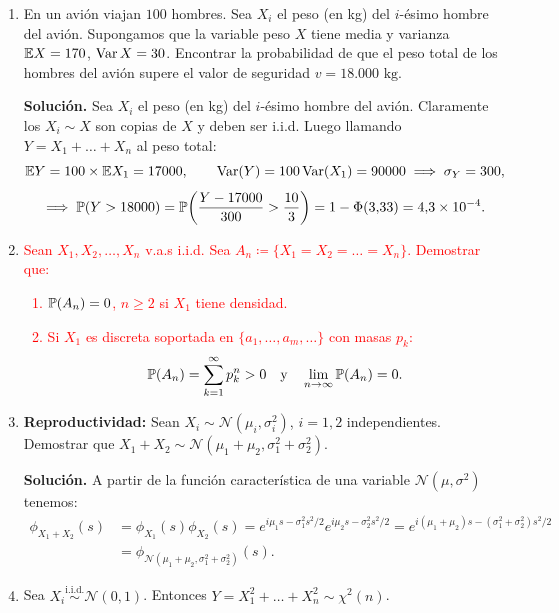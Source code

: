 \begin{enumerate}
  \item En un avión viajan $100$ hombres. Sea $X_i$ el peso (en kg) del $i$-ésimo hombre del avión. Supongamos que la variable peso $X$ tiene media y varianza $\mathbb{E} X = 170$, $\operatorname{Var} X = 30$. Encontrar la probabilidad de que el peso total de los hombres del avión supere el valor de seguridad $v = 18.000\text{ kg}$.

  \textbf{Solución.} Sea $X_i$ el peso (en kg) del $i$-ésimo hombre del avión. Claramente los $X_i \sim X$ son copias de $X$ y deben ser i.i.d. Luego llamando $Y = X_1 + \dots + X_n$ al peso total:
  \[
    \mathbb{E} Y = 100 \times \mathbb{E} X_1 = 17000, \qquad \operatorname{Var}(Y) = 100\operatorname{Var}(X_1) = 90000 \implies \sigma_Y = 300,
  \]
  \[
    \implies \mathbb{P}(Y > 18000) = \mathbb{P}\!\left(\frac{Y - 17000}{300} > \frac{10}{3}\right) = 1 - \Phi(3{,}33) = 4{,}3 \times 10^{-4}.
  \]

 \item \textcolor{red}{Sean $X_1, X_2, \dots, X_n$ v.a.s i.i.d. Sea $A_n \coloneqq \{X_1 = X_2 = \dots = X_n\}$. Demostrar que:
  \begin{enumerate}[label=(\alph*)]
    \item $\mathbb{P}(A_n) = 0$, $n \ge 2$ si $X_1$ tiene densidad.
    \item Si $X_1$ es discreta soportada en $\{a_1, \dots, a_m, \dots\}$ con masas $p_k$:
          \[
            \mathbb{P}(A_n) = \sum_{k=1}^\infty p_k^n > 0 \quad \text{y} \quad \lim_{n\to\infty} \mathbb{P}(A_n) = 0.
          \]
  \end{enumerate}}

  \item \textbf{Reproductividad:} Sean $X_i \sim \mathcal{N}(\mu_i, \sigma_i^2)$, $i=1,2$ independientes. Demostrar que $X_1 + X_2 \sim \mathcal{N}(\mu_1 + \mu_2, \sigma_1^2 + \sigma_2^2)$.

  \textbf{Solución.} A partir de la función característica de una variable $\mathcal{N}(\mu, \sigma^2)$ tenemos:
  \begin{align*}    
    \phi_{X_1 + X_2}(s) & = \phi_{X_1}(s)\phi_{X_2}(s) = e^{i\mu_1 s - \sigma_1^2 s^2/2} e^{i\mu_2 s - \sigma_2^2 s^2/2} = e^{i(\mu_1 + \mu_2)s - (\sigma_1^2 + \sigma_2^2)s^2/2} \\ & = \phi_{\mathcal{N}(\mu_1+\mu_2, \sigma_1^2+\sigma_2^2)}(s).  
  \end{align*}

  \item Sea $X_i \stackrel{\text{i.i.d.}}{\sim} \mathcal{N}(0,1)$. Entonces $Y = X_1^2 + \dots + X_n^2 \sim \chi^2(n)$.


\end{enumerate}
